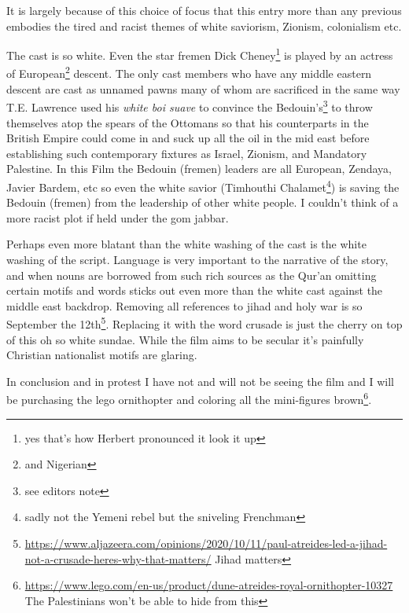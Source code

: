 \documentclass{article}
\begin{document}
 It is largely because of this choice of focus that this entry more than any previous embodies the tired and racist themes of white saviorism, Zionism, colonialism etc.

The cast is so white. Even the star fremen Dick Cheney\footnote{yes that's how Herbert pronounced it look it up} is played by an actress of European\footnote{and Nigerian} descent. The only cast members who have any middle eastern descent are cast as unnamed pawns many of whom are sacrificed in the same way T.E. Lawrence used his \textit{white boi suave} to convince the Bedouin's\footnote{see editors note} to throw themselves atop the spears of the Ottomans so that his counterparts in the British Empire could come in and suck up all the oil in the mid east before establishing such contemporary fixtures as Israel, Zionism, and Mandatory Palestine. In this Film the Bedouin (fremen) leaders are all European, Zendaya, Javier Bardem, etc so even the white savior (Timhouthi Chalamet\footnote{sadly not the Yemeni rebel but the sniveling Frenchman}) is saving the Bedouin (fremen) from the leadership of other white people. I couldn't think of a more racist plot if held under the gom jabbar.

Perhaps even more blatant than the white washing of the cast is the white washing of the script. Language is very important to the narrative of the story, and when nouns are borrowed from such rich sources as the Qur'an omitting certain motifs and words sticks out even more than the white cast against the middle east backdrop. Removing all references to jihad and holy war is so September the 12th\footnote{\href{https://www.aljazeera.com/opinions/2020/10/11/paul-atreides-led-a-jihad-not-a-crusade-heres-why-that-matters/}{https://www.aljazeera.com/opinions/2020/10/11/paul-atreides-led-a-jihad-not-a-crusade-heres-why-that-matters/} Jihad matters}. Replacing it with the word crusade is just the cherry on top of this oh so white sundae. While the film aims to be secular it's painfully Christian nationalist motifs are glaring.

In conclusion and in protest I have not and will not be seeing the film and I will be purchasing the lego ornithopter and coloring all the mini-figures brown\footnote{\href{https://www.lego.com/en-us/product/dune-atreides-royal-ornithopter-10327}{https://www.lego.com/en-us/product/dune-atreides-royal-ornithopter-10327} The Palestinians won't be able to hide from this}.

\hfill \break

\noindent{}
\end{document}
